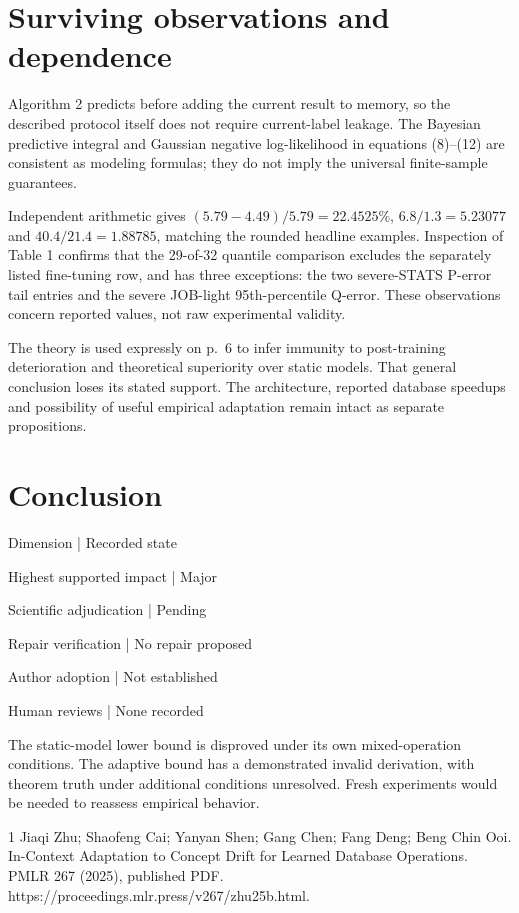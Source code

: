 \documentclass[10pt]{article}
\begin{document}
\section*{Surviving observations and dependence}
Algorithm 2 predicts before adding the current result to memory, so the described protocol itself does not require current-label leakage. The Bayesian predictive integral and Gaussian negative log-likelihood in equations (8)–(12) are consistent as modeling formulas; they do not imply the universal finite-sample guarantees.\par
Independent arithmetic gives \((5.79-4.49)/5.79=22.4525\%\), \(6.8/1.3=5.23077\) and \(40.4/21.4=1.88785\), matching the rounded headline examples. Inspection of Table 1 confirms that the 29-of-32 quantile comparison excludes the separately listed fine-tuning row, and has three exceptions: the two severe-STATS P-error tail entries and the severe JOB-light 95th-percentile Q-error. These observations concern reported values, not raw experimental validity.\par
The theory is used expressly on p. 6 to infer immunity to post-training deterioration and theoretical superiority over static models. That general conclusion loses its stated support. The architecture, reported database speedups and possibility of useful empirical adaptation remain intact as separate propositions.\par
\section*{Conclusion}
Dimension | Recorded state\par
Highest supported impact | Major\par
Scientific adjudication | Pending\par
Repair verification | No repair proposed\par
Author adoption | Not established\par
Human reviews | None recorded\par
The static-model lower bound is disproved under its own mixed-operation conditions. The adaptive bound has a demonstrated invalid derivation, with theorem truth under additional conditions unresolved. Fresh experiments would be needed to reassess empirical behavior.\par
1 Jiaqi Zhu; Shaofeng Cai; Yanyan Shen; Gang Chen; Fang Deng; Beng Chin Ooi. In-Context Adaptation to Concept Drift for Learned Database Operations. PMLR 267 (2025), published PDF. https://proceedings.mlr.press/v267/zhu25b.html.\par
\end{document}
